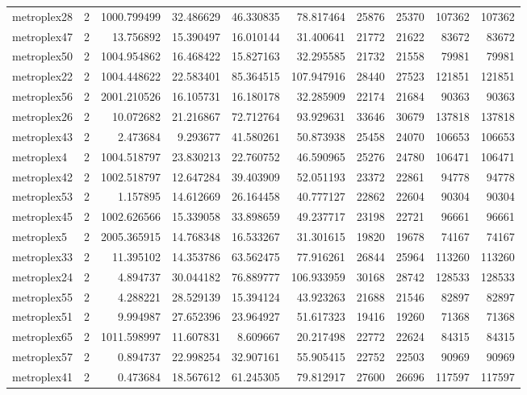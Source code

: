 \begin{longtable}{|l|r|r|r|r|r|r|r|r|r|}
metroplex28 & 2 & 1000.799499 & 32.486629 & 46.330835 & 78.817464 & 25876 & 25370 & 107362 & 107362 \\
metroplex47 & 2 & 13.756892 & 15.390497 & 16.010144 & 31.400641 & 21772 & 21622 & 83672 & 83672 \\
metroplex50 & 2 & 1004.954862 & 16.468422 & 15.827163 & 32.295585 & 21732 & 21558 & 79981 & 79981 \\
metroplex22 & 2 & 1004.448622 & 22.583401 & 85.364515 & 107.947916 & 28440 & 27523 & 121851 & 121851 \\
metroplex56 & 2 & 2001.210526 & 16.105731 & 16.180178 & 32.285909 & 22174 & 21684 & 90363 & 90363 \\
metroplex26 & 2 & 10.072682 & 21.216867 & 72.712764 & 93.929631 & 33646 & 30679 & 137818 & 137818 \\
metroplex43 & 2 & 2.473684 & 9.293677 & 41.580261 & 50.873938 & 25458 & 24070 & 106653 & 106653 \\
metroplex4 & 2 & 1004.518797 & 23.830213 & 22.760752 & 46.590965 & 25276 & 24780 & 106471 & 106471 \\
metroplex42 & 2 & 1002.518797 & 12.647284 & 39.403909 & 52.051193 & 23372 & 22861 & 94778 & 94778 \\
metroplex53 & 2 & 1.157895 & 14.612669 & 26.164458 & 40.777127 & 22862 & 22604 & 90304 & 90304 \\
metroplex45 & 2 & 1002.626566 & 15.339058 & 33.898659 & 49.237717 & 23198 & 22721 & 96661 & 96661 \\
metroplex5 & 2 & 2005.365915 & 14.768348 & 16.533267 & 31.301615 & 19820 & 19678 & 74167 & 74167 \\
metroplex33 & 2 & 11.395102 & 14.353786 & 63.562475 & 77.916261 & 26844 & 25964 & 113260 & 113260 \\
metroplex24 & 2 & 4.894737 & 30.044182 & 76.889777 & 106.933959 & 30168 & 28742 & 128533 & 128533 \\
metroplex55 & 2 & 4.288221 & 28.529139 & 15.394124 & 43.923263 & 21688 & 21546 & 82897 & 82897 \\
metroplex51 & 2 & 9.994987 & 27.652396 & 23.964927 & 51.617323 & 19416 & 19260 & 71368 & 71368 \\
metroplex65 & 2 & 1011.598997 & 11.607831 & 8.609667 & 20.217498 & 22772 & 22624 & 84315 & 84315 \\
metroplex57 & 2 & 0.894737 & 22.998254 & 32.907161 & 55.905415 & 22752 & 22503 & 90969 & 90969 \\
metroplex41 & 2 & 0.473684 & 18.567612 & 61.245305 & 79.812917 & 27600 & 26696 & 117597 & 117597 \\

\end{longtable}
